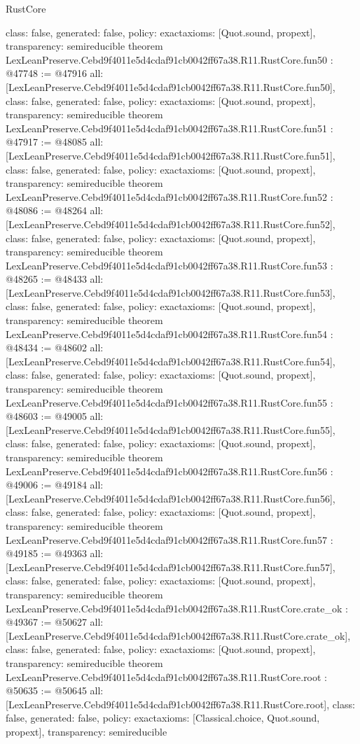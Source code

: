 \begin{lexlean}{RustCore}
\begin{coremodule}
{  class: false,
  generated: false,
  policy: exact{axioms: [Quot.sound, propext]},
  transparency: semireducible
}
theorem LexLeanPreserve.Cebd9f4011e5d4cdaf91cb0042ff67a38.R11.RustCore.fun50 : @47748 := @47916 {
  all: [LexLeanPreserve.Cebd9f4011e5d4cdaf91cb0042ff67a38.R11.RustCore.fun50],
  class: false,
  generated: false,
  policy: exact{axioms: [Quot.sound, propext]},
  transparency: semireducible
}
theorem LexLeanPreserve.Cebd9f4011e5d4cdaf91cb0042ff67a38.R11.RustCore.fun51 : @47917 := @48085 {
  all: [LexLeanPreserve.Cebd9f4011e5d4cdaf91cb0042ff67a38.R11.RustCore.fun51],
  class: false,
  generated: false,
  policy: exact{axioms: [Quot.sound, propext]},
  transparency: semireducible
}
theorem LexLeanPreserve.Cebd9f4011e5d4cdaf91cb0042ff67a38.R11.RustCore.fun52 : @48086 := @48264 {
  all: [LexLeanPreserve.Cebd9f4011e5d4cdaf91cb0042ff67a38.R11.RustCore.fun52],
  class: false,
  generated: false,
  policy: exact{axioms: [Quot.sound, propext]},
  transparency: semireducible
}
theorem LexLeanPreserve.Cebd9f4011e5d4cdaf91cb0042ff67a38.R11.RustCore.fun53 : @48265 := @48433 {
  all: [LexLeanPreserve.Cebd9f4011e5d4cdaf91cb0042ff67a38.R11.RustCore.fun53],
  class: false,
  generated: false,
  policy: exact{axioms: [Quot.sound, propext]},
  transparency: semireducible
}
theorem LexLeanPreserve.Cebd9f4011e5d4cdaf91cb0042ff67a38.R11.RustCore.fun54 : @48434 := @48602 {
  all: [LexLeanPreserve.Cebd9f4011e5d4cdaf91cb0042ff67a38.R11.RustCore.fun54],
  class: false,
  generated: false,
  policy: exact{axioms: [Quot.sound, propext]},
  transparency: semireducible
}
theorem LexLeanPreserve.Cebd9f4011e5d4cdaf91cb0042ff67a38.R11.RustCore.fun55 : @48603 := @49005 {
  all: [LexLeanPreserve.Cebd9f4011e5d4cdaf91cb0042ff67a38.R11.RustCore.fun55],
  class: false,
  generated: false,
  policy: exact{axioms: [Quot.sound, propext]},
  transparency: semireducible
}
theorem LexLeanPreserve.Cebd9f4011e5d4cdaf91cb0042ff67a38.R11.RustCore.fun56 : @49006 := @49184 {
  all: [LexLeanPreserve.Cebd9f4011e5d4cdaf91cb0042ff67a38.R11.RustCore.fun56],
  class: false,
  generated: false,
  policy: exact{axioms: [Quot.sound, propext]},
  transparency: semireducible
}
theorem LexLeanPreserve.Cebd9f4011e5d4cdaf91cb0042ff67a38.R11.RustCore.fun57 : @49185 := @49363 {
  all: [LexLeanPreserve.Cebd9f4011e5d4cdaf91cb0042ff67a38.R11.RustCore.fun57],
  class: false,
  generated: false,
  policy: exact{axioms: [Quot.sound, propext]},
  transparency: semireducible
}
theorem LexLeanPreserve.Cebd9f4011e5d4cdaf91cb0042ff67a38.R11.RustCore.crate_ok : @49367 := @50627 {
  all: [LexLeanPreserve.Cebd9f4011e5d4cdaf91cb0042ff67a38.R11.RustCore.crate_ok],
  class: false,
  generated: false,
  policy: exact{axioms: [Quot.sound, propext]},
  transparency: semireducible
}
theorem LexLeanPreserve.Cebd9f4011e5d4cdaf91cb0042ff67a38.R11.RustCore.root : @50635 := @50645 {
  all: [LexLeanPreserve.Cebd9f4011e5d4cdaf91cb0042ff67a38.R11.RustCore.root],
  class: false,
  generated: false,
  policy: exact{axioms: [Classical.choice, Quot.sound, propext]},
  transparency: semireducible
}


\end{coremodule}
\end{lexlean}
